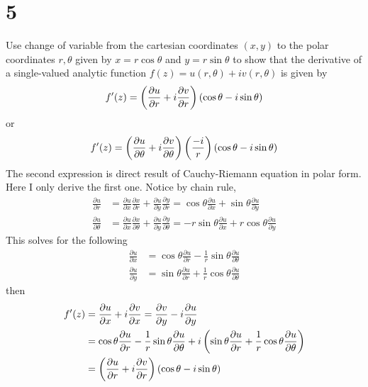 \documentclass{article}
\begin{document}
\section*{5}
\begin{myleftlinebox}
    Use change of variable from the cartesian coordinates \((x,y)\) to the polar coordinates \(r,\theta\) given by \(x=r\cos \theta\) and \(y=r\sin \theta\) to show that the derivative of a single-valued analytic function \(f(z)=u(r,\theta)+iv(r,\theta)\) is given by 
    \[f'(z)=\left( \frac{\partial u}{\partial r}+i\frac{\partial v}{\partial r} \right)\left( \cos\theta-i\sin\theta \right)\]
    or
    \[f'(z)=\left( \frac{\partial u}{\partial \theta}+i\frac{\partial v}{\partial \theta} \right)\left( \frac{-i}{r} \right)\left( \cos\theta-i\sin\theta \right)\]
    \tcbline
    The second expression is direct result of Cauchy-Riemann equation in polar form. Here I only derive the first one. Notice by chain rule,
    \begin{align*}
        \frac{\partial u}{\partial r}&=\frac{\partial u}{\partial x}\frac{\partial x}{\partial r}+\frac{\partial u}{\partial y}\frac{\partial y}{\partial r}=\cos\theta \frac{\partial u}{\partial x}+\sin\theta\frac{\partial u}{\partial y}\\
        \frac{\partial u}{\partial \theta}&=\frac{\partial u}{\partial x}\frac{\partial x}{\partial \theta}+\frac{\partial u}{\partial y}\frac{\partial y}{\partial \theta}=-r\sin\theta \frac{\partial u}{\partial x}+r\cos\theta\frac{\partial u}{\partial y}
    \end{align*}
    This solves for the following
    \begin{align*}
        \frac{\partial u}{\partial x} &= \cos\theta\frac{\partial u}{\partial r}-\frac{1}{r}\sin\theta\frac{\partial u}{\partial \theta}\\
        \frac{\partial u}{\partial y} &= \sin\theta\frac{\partial u}{\partial r}+\frac{1}{r}\cos\theta\frac{\partial u}{\partial \theta}
    \end{align*}
    then
    \begin{align*}
        f'(z) &= \frac{\partial u}{\partial x}+i\frac{\partial v}{\partial x}=\frac{\partial v}{\partial y}-i\frac{\partial u}{\partial y}\\
        &= \cos\theta\frac{\partial u}{\partial r}-\frac{1}{r}\sin\theta\frac{\partial u}{\partial \theta}+i\left( \sin\theta\frac{\partial u}{\partial r}+\frac{1}{r}\cos\theta\frac{\partial u}{\partial \theta} \right)\\
        &= \left( \frac{\partial u}{\partial r}+i\frac{\partial v}{\partial r} \right)\left( \cos\theta-i\sin\theta \right)
    \end{align*}
\end{myleftlinebox}
\end{document}
